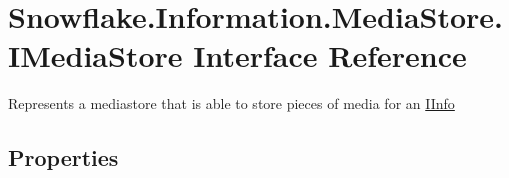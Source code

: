 \hypertarget{interface_snowflake_1_1_information_1_1_media_store_1_1_i_media_store}{}\section{Snowflake.\+Information.\+Media\+Store.\+I\+Media\+Store Interface Reference}
\label{interface_snowflake_1_1_information_1_1_media_store_1_1_i_media_store}


Represents a mediastore that is able to store pieces of media for an \hyperlink{interface_snowflake_1_1_information_1_1_i_info}{I\+Info}  


\subsection*{Properties}
